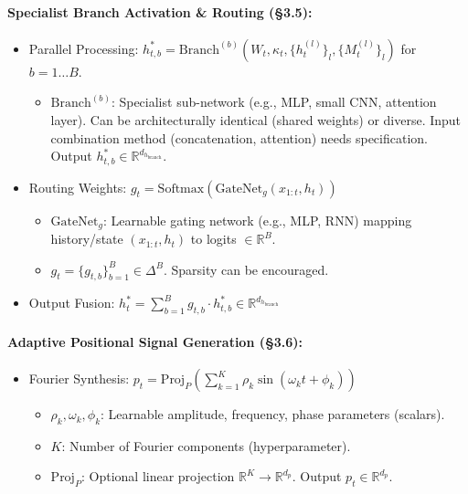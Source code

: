 \documentclass{article}
\begin{document}
\paragraph{Specialist Branch Activation \& Routing (\S3.5):}
\begin{itemize}
    \item Parallel Processing: $h^*_{t,b} = \text{Branch}^{(b)}(W_t, \kappa_t, \{h_t^{(l)}\}_l, \{M_t^{(l)}\}_l)$ for $b = 1\dots B$.
        \begin{itemize}
        \item $\text{Branch}^{(b)}$: Specialist sub-network (e.g., MLP, small CNN, attention layer). Can be architecturally identical (shared weights) or diverse. Input combination method (concatenation, attention) needs specification. Output $h^*_{t,b} \in \mathbb{R}^{d_{h_{\text{branch}}}}$.
        \end{itemize}
    \item Routing Weights: $g_t = \text{Softmax}(\text{GateNet}_g(x_{1:t}, h_t))$
        \begin{itemize}
        \item $\text{GateNet}_g$: Learnable gating network (e.g., MLP, RNN) mapping history/state $(x_{1:t}, h_t)$ to logits $\in \mathbb{R}^B$.
        \item $g_t = \{g_{t,b}\}_{b=1}^B \in \Delta^B$. Sparsity can be encouraged.
        \end{itemize}
    \item Output Fusion: $h^*_t = \sum_{b=1}^B g_{t,b} \cdot h^*_{t,b} \in \mathbb{R}^{d_{h_{\text{branch}}}}$
\end{itemize}

\paragraph{Adaptive Positional Signal Generation (\S3.6):}
\begin{itemize}
    \item Fourier Synthesis: $p_t = \text{Proj}_P\left(\sum_{k=1}^K \rho_k \sin(\omega_k t + \phi_k)\right)$
        \begin{itemize}
        \item $\rho_k, \omega_k, \phi_k$: Learnable amplitude, frequency, phase parameters (scalars).
        \item $K$: Number of Fourier components (hyperparameter).
        \item $\text{Proj}_P$: Optional linear projection $\mathbb{R}^K \to \mathbb{R}^{d_p}$. Output $p_t \in \mathbb{R}^{d_p}$.
        \end{itemize}
\end{itemize}
\end{document}

